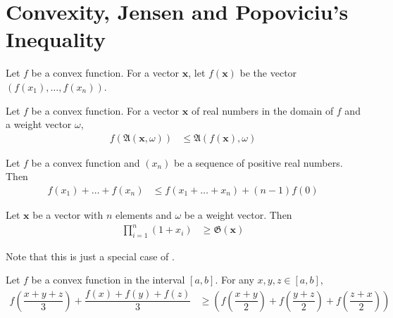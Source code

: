\documentclass{subfile}
\begin{document}
	\section[Jensen and Popoviciu]{Convexity, Jensen and Popoviciu's Inequality}\label{sec:convexity}
	
	Let $f$ be a convex function. For a vector $\mathbf{x}$, let $f(\mathbf{x})$ be the vector $(f(x_{1}),\ldots,f(x_{n}))$.
		\begin{theorem}\label{thm:jensen}
			Let $f$ be a convex function. For a vector $\mathbf{x}$ of real numbers in the domain of $f$ and a weight vector $\omega$,
				\begin{align*}
					f\left(\mathfrak{A}(\mathbf{x},\omega)\right)
						& \leq \mathfrak{A}(f(\mathbf{x}),\omega)
				\end{align*}
		\end{theorem}
	
		\begin{theorem}
			Let $f$ be a convex function and $(x_{n})$ be a sequence of positive real numbers. Then
				\begin{align*}
					f(x_{1})+\ldots+f(x_{n})
						& \leq f(x_{1}+\ldots+x_{n})+(n-1)f(0)
				\end{align*}
		\end{theorem}
	
		\begin{theorem}
			Let $\mathbf{x}$ be a vector with $n$ elements and $\omega$ be a weight vector. Then
				\begin{align*}
					\prod_{i=1}^{n}(1+x_{i})
						& \geq \mathfrak{G}(\mathbf{x})
				\end{align*}
		\end{theorem}
	Note that this is just a special case of .
		\begin{theorem}
			Let $f$ be a convex function in the interval $[a,b]$. For any $x,y,z\in[a,b]$,
				\begin{align*}
					f\left(\dfrac{x+y+z}{3}\right)+\dfrac{f(x)+f(y)+f(z)}{3}
						& \geq \left(f\left(\dfrac{x+y}{2}\right)+f\left(\dfrac{y+z}{2}\right)+f\left(\dfrac{z+x}{2}\right)\right)
				\end{align*}
		\end{theorem}
\end{document}
